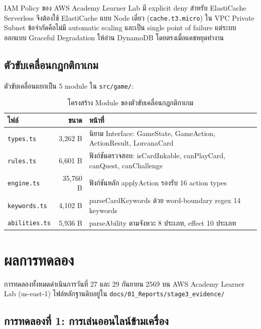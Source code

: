 \documentclass[12pt,a4paper]{report}
\begin{document}
IAM Policy ของ AWS Academy Learner Lab มี explicit deny สำหรับ ElastiCache Serverless จึงต้องใช้ ElastiCache แบบ Node เดี่ยว (\texttt{cache.t3.micro}) ใน VPC Private Subnet ข้อจำกัดคือไม่มี automatic scaling และเป็น single point of failure แต่ระบบออกแบบ Graceful Degradation ให้อ่าน DynamoDB โดยตรงเมื่อแคชหยุดทำงาน

\section{ตัวขับเคลื่อนกฎกติกาเกม}

ตัวขับเคลื่อนแยกเป็น 5 module ใน \texttt{src/game/}:

\begin{table}[H]
\centering
\caption{โครงสร้าง Module ของตัวขับเคลื่อนกฎกติกาเกม}
\begin{tabularx}{\textwidth}{lrX}
\toprule
\textbf{ไฟล์} & \textbf{ขนาด} & \textbf{หน้าที่} \\
\midrule
\texttt{types.ts} & 3,262 B & นิยาม Interface: GameState, GameAction, ActionResult, LorcanaCard \\
\texttt{rules.ts} & 6,601 B & ฟังก์ชันตรวจสอบ: isCardInkable, canPlayCard, canQuest, canChallenge \\
\texttt{engine.ts} & 35,760 B & ฟังก์ชันหลัก applyAction รองรับ 16 action types \\
\texttt{keywords.ts} & 4,102 B & parseCardKeywords ด้วย word-boundary regex 14 keywords \\
\texttt{abilities.ts} & 5,936 B & parseAbility ตามจังหวะ 8 ประเภท, effect 10 ประเภท \\
\bottomrule
\end{tabularx}
\end{table}

\chapter{ผลการทดลอง}

การทดลองทั้งหมดดำเนินการวันที่ 27 และ 29 กันยายน 2569 บน AWS Academy Learner Lab (us-east-1) ไฟล์หลักฐานดิบอยู่ใน \nolinkurl{docs/01_Reports/stage3_evidence/}

\section{การทดลองที่ 1: การเล่นออนไลน์ข้ามเครื่อง}
\end{document}
